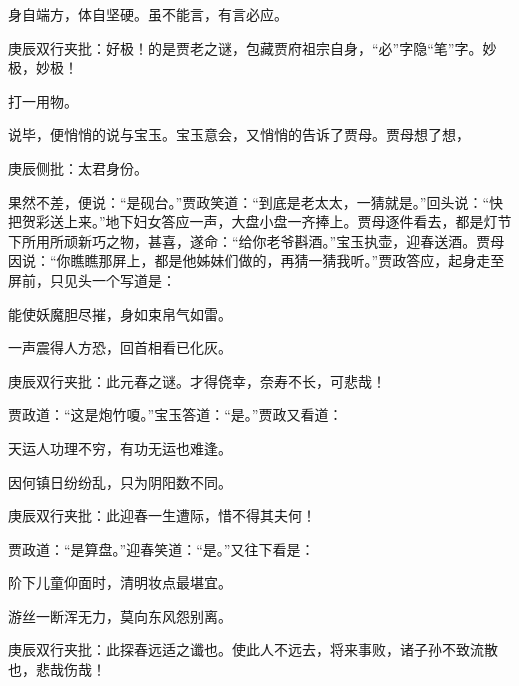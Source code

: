 \begin{parag}
    身自端方，体自坚硬。虽不能言，有言必应。\begin{note}庚辰双行夹批：好极！的是贾老之谜，包藏贾府祖宗自身，“必”字隐“笔”字。妙极，妙极！\end{note}打一用物。
\end{parag}


\begin{parag}
    说毕，便悄悄的说与宝玉。宝玉意会，又悄悄的告诉了贾母。贾母想了想，\begin{note}庚辰侧批：太君身份。\end{note}果然不差，便说：“是砚台。”贾政笑道：“到底是老太太，一猜就是。”回头说：“快把贺彩送上来。”地下妇女答应一声，大盘小盘一齐捧上。贾母逐件看去，都是灯节下所用所顽新巧之物，甚喜，遂命：“给你老爷斟酒。”宝玉执壶，迎春送酒。贾母因说：“你瞧瞧那屏上，都是他姊妹们做的，再猜一猜我听。”贾政答应，起身走至屏前，只见头一个写道是：
\end{parag}


\begin{poem}
    \begin{pl}能使妖魔胆尽摧，身如束帛气如雷。\end{pl}

    \begin{pl}一声震得人方恐，回首相看已化灰。\end{pl} \begin{note}庚辰双行夹批：此元春之谜。才得侥幸，奈寿不长，可悲哉！\end{note}
\end{poem}


\begin{parag}
    贾政道：“这是炮竹嗄。”宝玉答道：“是。”贾政又看道：
\end{parag}
\begin{poem}

    \begin{pl}天运人功理不穷，有功无运也难逢。\end{pl}

    \begin{pl}因何镇日纷纷乱，只为阴阳数不同。\end{pl}
    \begin{note}庚辰双行夹批：此迎春一生遭际，惜不得其夫何！\end{note}
\end{poem}


\begin{parag}
    贾政道：“是算盘。”迎春笑道：“是。”又往下看是：
\end{parag}
\begin{poem}

    \begin{pl}阶下儿童仰面时，清明妆点最堪宜。\end{pl}

    \begin{pl}游丝一断浑无力，莫向东风怨别离。\end{pl}
    \begin{note}庚辰双行夹批：此探春远适之谶也。使此人不远去，将来事败，诸子孙不致流散也，悲哉伤哉！\end{note}
\end{poem}


